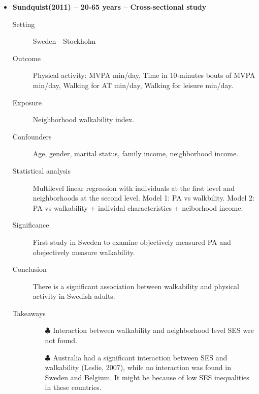 \documentclass{article}
\begin{document}
\begin{itemize}
\item{\bf Sundquist(2011) -- 20-65 years  -- Cross-sectional study}
		\begin{description}
			\item[Setting] Sweden - Stockholm 
			\item[Outcome] Physical activity: MVPA min/day, Time in 10-minutes bouts of MVPA min/day, Walking for AT min/day, Walking for leisure min/day. 
			\item[Exposure] Neighborhood walkability index.  
			\item[Confounders] Age, gender, marital status, family income, neighborhood income. 
			\item[Statistical analysis] Multilevel linear regression with individuals at the first level and neighborhoods at the second level. Model 1: PA vs walkbility. Model 2: PA vs walkability + individal characteristics + neiborhood income. 
			\item[Significance] First study in Sweden to examine objectively measured PA and obejectively measure walkability.  
			\item[Conclusion] There is a significant association between walkability and physical activity in Swedish adults. 
			\item[Takeaways] \mbox{}\par
				\begin{itemize}
					\item[$\clubsuit$] Interaction between walkability and neighborhood level SES wre not found.
					\item[$\clubsuit$] Australia had a significant interaction between SES and walkability (Leslie, 2007), while no interaction was found in Sweden and Belgium. It might be because of low SES inequalities in these countries.  
				\end{itemize} 
		\end{description}


\end{itemize}
\end{document}
